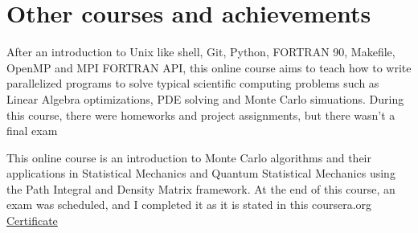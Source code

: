 \documentclass[11pt,a4paper]{moderncv}
\begin{document}
\section{Other courses and achievements}
{\small After an introduction to Unix like shell, Git, Python, FORTRAN 90, Makefile, OpenMP and MPI FORTRAN API, this online course aims to teach how to write parallelized programs to solve typical scientific computing problems such as Linear Algebra optimizations, PDE solving and Monte Carlo simuations. During this course, there were homeworks and project assignments, but there wasn't a final exam}

{\small This online course is an introduction to Monte Carlo algorithms and their applications in Statistical Mechanics and Quantum Statistical Mechanics using the Path Integral and Density Matrix framework. At the end of this course, an exam was scheduled, and I completed it as it is stated in this coursera.org \textcolor{blue}{\href{http://dgiannelli.github.io/coursera_smac.pdf}{Certificate}}}

\end{document}
